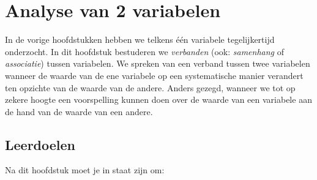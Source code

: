 \chapter{Analyse van 2 variabelen}
\label{ch:analyse2var}

In de vorige hoofdstukken hebben we telkens één variabele tegelijkertijd onderzocht. In dit hoofdstuk bestuderen we \emph{verbanden} (ook: \emph{samenhang} of \emph{associatie}) tussen variabelen. We spreken van een verband tussen twee variabelen wanneer de waarde van de ene variabele op een systematische manier verandert ten opzichte van de waarde van de andere. Anders gezegd, wanneer we tot op zekere hoogte een voorspelling kunnen doen over de waarde van een variabele aan de hand van de waarde van een andere.

\section{Leerdoelen}
\label{sec:analyse2var-leerdoelen}

Na dit hoofdstuk moet je in staat zijn om:

